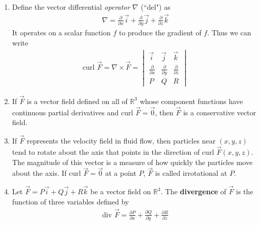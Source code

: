 \documentclass[10pt]{article}
\begin{document}
\begin{multicols*}{2}
\begin{enumerate}
\begin{enumerate}
        \item Define the vector differential \textit{operator} $\nabla$ (``del") as
        \vspace{-3mm}
        \begin{align*}
            \nabla = 
            \frac{\partial}{\partial x}\vec{i} + \frac{\partial}{\partial y}\vec{j} + \frac{\partial}{\partial z}\vec{k} 
        \end{align*}
        It operates on a scalar function $f$ to produce the gradient of $f$. Thus we can write
        \begin{align*}
            \text{curl }\vec{F} = 
            \nabla \times \vec{F} =
            \begin{vmatrix}
            \vec{i} & \vec{j} & \vec{k} \\[3 pt]
            \frac{\partial}{\partial x} & \frac{\partial}{\partial y} & \frac{\partial}{\partial z} \\[5 pt]
            P & Q & R
            \end{vmatrix}
        \end{align*}
        \item If $\vec{F}$ is a vector field defined on all of $\mathbb{R}^3$ whose component functions have continuous partial derivatives and $\text{curl }\vec{F}=\vec{0}$, then $\vec{F}$ is a conservative vector field.
        \item If $\vec{F}$ represents the velocity field in fluid flow, then particles near $(x,y,z)$ tend to rotate about the axis that points in the direction of $\text{curl }\vec{F}(x,y,z)$. The magnitude of this vector is a measure of how quickly the particles move about the axis. If $\text{curl }\vec{F}=\vec{0}$ at a point $P$, $\vec{F}$ is called irrotational at $P$.
        \item Let $\vec{F} = P\vec{i} + Q\vec{j} + R\vec{k}$ be a vector field on $\mathbb{R}^3$. The \textbf{divergence} of $\vec{F}$ is the function of three variables defined by
        \begin{align*}
            \text{div }\vec{F} = \frac{\partial P}{\partial x} + \frac{\partial Q}{\partial y} + \frac{\partial R}{\partial z} 

\end{align*}
\end{enumerate}
\end{enumerate}
\end{multicols*}
\end{document}

